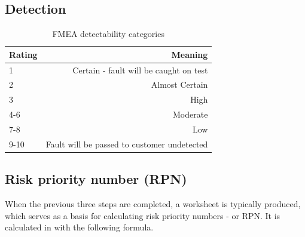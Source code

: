 \documentclass[10pt,oneside]{book}                  %
\begin{document}
\subsection{Detection}
\label{sec:fmea_detection}

\begin{table}[h]
\centering
    \begin{tabular}{ | l | r | }
    \hline
    Rating & Meaning \\ \hline \hline
    1      & Certain - fault will be caught on test  \\ \hline
    2      & Almost Certain \\ \hline
    3      & High \\ \hline
    4-6    & Moderate \\ \hline
    7-8    & Low \\ \hline
    9-10   & Fault will be passed to customer undetected \\ \hline
    \end{tabular}
\caption{FMEA detectability categories}
\label{table:fmea_detectability}
\end{table}




\subsection{Risk priority number (RPN)}
When the previous three steps are completed, a worksheet is typically produced, which serves as a basis for calculating risk priority numbers - or RPN. It is calculated in with the following formula.
\end{document}
